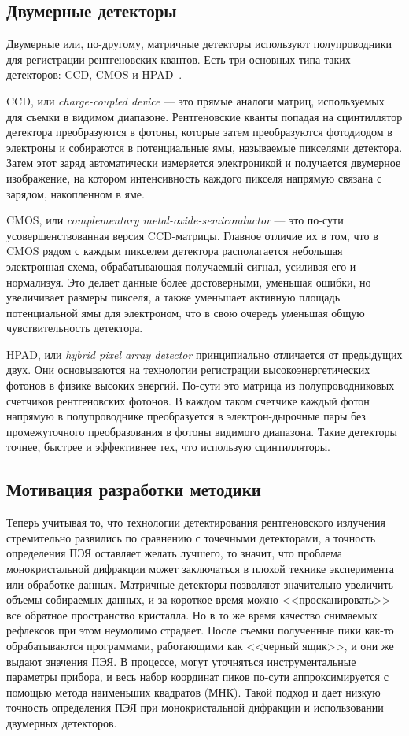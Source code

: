 \subsection{Двумерные детекторы}

Двумерные или, по-другому, матричные детекторы используют полупроводники для регистрации рентгеновских квантов.
Есть три основных типа таких детекторов: CCD, CMOS и HPAD~\cite{Alle:2016}.

CCD, или \textit{charge-coupled device} --- это прямые аналоги матриц, используемых для съемки в видимом диапазоне.
Рентгеновские кванты попадая на сцинтиллятор детектора преобразуются в фотоны, которые затем преобразуются фотодиодом в электроны и собираются в потенциальные ямы, называемые пикселями детектора.
Затем этот заряд автоматически измеряется электроникой и получается двумерное изображение, на котором интенсивность каждого пикселя напрямую связана с зарядом, накопленном в яме.

CMOS, или \textit{complementary metal-oxide-semiconductor} --- это по-сути усовершенствованная версия CCD-матрицы.
Главное отличие их в том, что в CMOS рядом с каждым пикселем детектора располагается небольшая электронная схема, обрабатывающая получаемый сигнал, усиливая его и нормализуя.
Это делает данные более достоверными, уменьшая ошибки, но увеличивает размеры пикселя, а также уменьшает активную площадь потенциальной ямы для электроном, что в свою очередь уменьшая общую чувствительность детектора.

HPAD, или \textit{hybrid pixel array detector} принципиально отличается от предыдущих двух.
Они основываются на технологии регистрации высокоэнергетических фотонов в физике высоких энергий.
По-сути это матрица из полупроводниковых счетчиков рентгеновских фотонов.
В каждом таком счетчике каждый фотон напрямую в полупроводнике преобразуется в электрон-дырочные пары без промежуточного преобразования в фотоны видимого диапазона.
Такие детекторы точнее, быстрее и эффективнее тех, что использую сцинтилляторы.

\subsection{Мотивация разработки методики}

Теперь учитывая то, что технологии детектирования рентгеновского излучения стремительно развились по сравнению с точечными детекторами, а точность определения ПЭЯ оставляет желать лучшего, то значит, что проблема монокристальной дифракции может заключаться в плохой технике эксперимента или обработке данных.
Матричные детекторы позволяют значительно увеличить объемы собираемых данных, и за короткое время можно <<просканировать>> все обратное пространство кристалла.
Но в то же время качество снимаемых рефлексов при этом неумолимо страдает.
После съемки полученные пики как-то обрабатываются программами, работающими как <<черный ящик>>, и они же выдают значения ПЭЯ.
В процессе, могут уточняться инструментальные параметры прибора, и весь набор координат пиков по-сути аппроксимируется с помощью метода наименьших квадратов (МНК).
Такой подход и дает низкую точность определения ПЭЯ при монокристальной дифракции и использовании двумерных детекторов.

